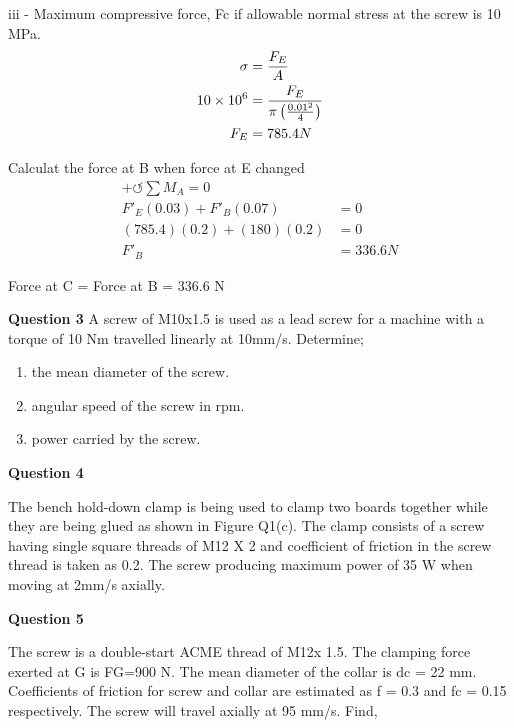 \documentclass[a4paper, fleqn]{article}
\providecommand{\sci}[1]{\protect\ensuremath{\times 10^{\StrSubstitute[0]{#1}{e}{}}}}
\begin{document}
iii - Maximum compressive force, Fc if allowable normal stress at the screw is 10 MPa.
\begin{equation*}
    \begin{aligned}
    \sigma &= \frac{F_E}{A}\\
    10\sci{6}&=\frac{F_E}{\pi \left(\frac{0.01^2}{4}\right)}\\
    F_E &=785.4 N
    \end{aligned}
\end{equation*}

Calculat the force at B when force at E changed
\begin{equation*}
    \begin{aligned}
    +\circlearrowleft \sum M_A =0\\  
    F'_E(0.03)+F'_B(0.07) &=0\\ 
    (785.4)(0.2)+(180)(0.2) &=0\\ 
    F'_B &= 336.6 N
    \end{aligned}
\end{equation*}

Force at C = Force at B = 336.6 N

\newpage
\textbf{Question 3}
A screw of M10x1.5 is used as a lead screw for a machine with a torque of 10 Nm travelled linearly at 10mm/s. Determine;
\begin{enumerate}[label=(\roman*)]
    \item the mean diameter of the screw.
    \item angular speed of the screw in rpm.
    \item power carried by the screw.
\end{enumerate}

\newpage
\textbf{Question 4}

The bench hold-down clamp is being used to clamp two boards together while they are being glued as shown in Figure Q1(c). The clamp consists of a screw having single square threads of M12 X 2 and coefficient of friction in the screw thread is taken as 0.2. The screw producing maximum power of 35 W when moving at 2mm/s axially.

\newpage
\textbf{Question 5}

The screw is a double-start ACME thread of M12x 1.5. The clamping force exerted at G is FG=900 N. The mean diameter of the collar is dc = 22 mm. Coefficients of friction for screw and collar are estimated as f = 0.3 and fc = 0.15 respectively. The screw will travel axially at 95 mm/s. Find,
\end{document}
